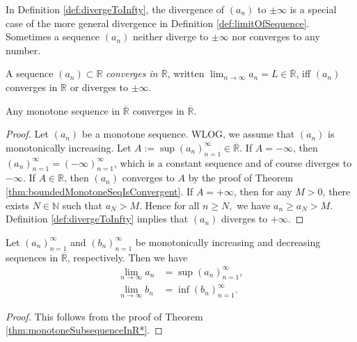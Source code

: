 \begin{rem}
  In Definition \ref{def:divergeToInfty},
  the divergence of $(a_n)$ to $\pm \infty$
  is a special case of the more general divergence
  in Definition \ref{def:limitOfSequence}. 
  Sometimes a sequence $(a_n)$ neither diverge to $\pm \infty$
  nor converges to any number.  
\end{rem}

\begin{defn}
  \label{def:limitOfSequenceInRclosure}
  A sequence $(a_n)\subset \mathbb{R}$
  \emph{converges in $\overline{\mathbb{R}}$},
  written $\lim_{n\rightarrow \infty} a_n = L\in \overline{\mathbb{R}}$,
  iff $(a_{n})$ converges in $\mathbb{R}$ or
  diverges to $\pm \infty$. 
\end{defn}

\begin{thm}
  \label{thm:monotoneSubsequenceInR*}
  Any monotone sequence in $\overline{\mathbb{R}}$ converges in $\overline{\mathbb{R}}$.
\end{thm}
\begin{proof}
  Let $(a_{n})$ be a monotone sequence.
  WLOG, we assume that $(a_{n})$ is monotonically increasing.
  Let $A:=\sup(a_{n})_{n=1}^{\infty}\in \overline{\mathbb{R}}. $
  If $A=-\infty$, then $(a_{n})_{n=1}^{\infty}=(-\infty)_{n=1}^{\infty}$,
  which is a constant sequence and of course diverges to $-\infty$.
  If $A\in \mathbb{R}$, then $(a_{n})$ converges to $A$ by the proof of
  Theorem \ref{thm:boundedMonotoneSeqIsConvergent}.
  If $A=+\infty$, then for any $M>0$,
  there exists $N\in \mathbb{N}$ such that $a_{N}>M$.
  Hence for all $n\ge N,$ we have $a_{n}\ge a_{N}>M$.
  Definition \ref{def:divergeToInfty} implies
  that $(a_{n})$ diverges to $+\infty$.
\end{proof}

\begin{coro}
  \label{coro:theEquivalenceOfMonotoneSequenceLimit}
  Let $(a_{n})_{n=1}^{\infty}$ and $(b_{n})_{n=1}^{\infty}$
  be monotonically increasing and decreasing
  sequences in $\overline{\mathbb{R}}$, respectively. Then we have
  \begin{align}
    \lim_{n\rightarrow \infty}a_{n}&=\sup(a_{n})_{n=1}^{\infty},
    \label{eq:monotonicallyIncreasingLimit}
    \\
    \lim_{n\rightarrow \infty}b_{n}&=\inf(b_{n})_{n=1}^{\infty}.
    \label{eq:monotonicallyDecreasingLimit}
  \end{align}
\end{coro}
\begin{proof}
  This follows from the proof of
  Theorem \ref{thm:monotoneSubsequenceInR*}.
\end{proof}

